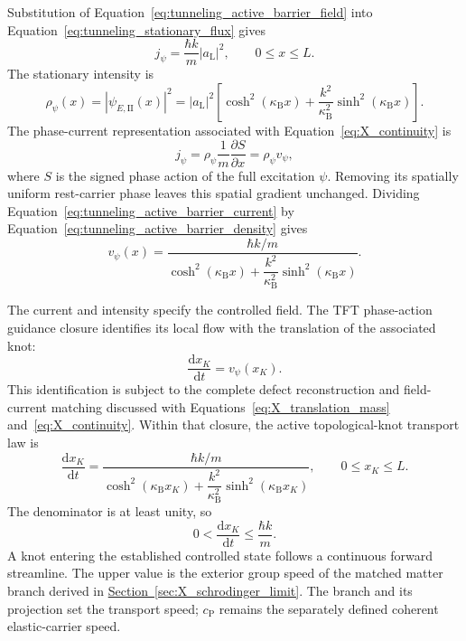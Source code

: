 Substitution of Equation~\eqref{eq:tunneling_active_barrier_field} into Equation~\eqref{eq:tunneling_stationary_flux} gives
\begin{equation}
    \boxed{
    j_\psi=\frac{\hbar k}{m}|a_{\mathrm L}|^2
    },\qquad 0\leq x\leq L.
    \label{eq:tunneling_active_barrier_current}
\end{equation}
The stationary intensity is
\begin{equation}
    \rho_\psi(x)
    =|\psi_{E,\mathrm{II}}(x)|^2
    =|a_{\mathrm L}|^2
    \left[
        \cosh^2(\kappa_{\mathrm B}x)
        +\frac{k^2}{\kappa_{\mathrm B}^2}
        \sinh^2(\kappa_{\mathrm B}x)
    \right].
    \label{eq:tunneling_active_barrier_density}
\end{equation}
The phase-current representation associated with Equation~\eqref{eq:X_continuity} is
\begin{equation}
    j_\psi
    =\rho_\psi\frac{1}{m}\frac{\partial S}{\partial x}
    =\rho_\psi v_\psi,
    \label{eq:tunneling_active_madelung_current}
\end{equation}
where $S$ is the signed phase action of the full excitation $\psi$. Removing its spatially uniform rest-carrier phase leaves this spatial gradient unchanged. Dividing Equation~\eqref{eq:tunneling_active_barrier_current} by Equation~\eqref{eq:tunneling_active_barrier_density} gives
\begin{equation}
    \boxed{
    v_\psi(x)
    =\frac{\hbar k/m}
    {\cosh^2(\kappa_{\mathrm B}x)
    +\dfrac{k^2}{\kappa_{\mathrm B}^2}\sinh^2(\kappa_{\mathrm B}x)}
    }.
    \label{eq:tunneling_active_phase_velocity}
\end{equation}

The current and intensity specify the controlled field. The TFT phase-action guidance closure identifies its local flow with the translation of the associated knot:
\begin{equation}
    \frac{\mathrm dx_K}{\mathrm dt}=v_\psi(x_K).
    \label{eq:tunneling_knot_guidance}
\end{equation}
This identification is subject to the complete defect reconstruction and field-current matching discussed with Equations~\eqref{eq:X_translation_mass} and~\eqref{eq:X_continuity}. Within that closure, the active topological-knot transport law is
\begin{equation}
    \boxed{
    \frac{\mathrm dx_K}{\mathrm dt}
    =\frac{\hbar k/m}
    {\cosh^2(\kappa_{\mathrm B}x_K)
    +\dfrac{k^2}{\kappa_{\mathrm B}^2}\sinh^2(\kappa_{\mathrm B}x_K)}
    },\qquad 0\leq x_K\leq L.
    \label{eq:tunneling_active_knot_transport}
\end{equation}
The denominator is at least unity, so
\begin{equation}
    0<\frac{\mathrm dx_K}{\mathrm dt}\leq\frac{\hbar k}{m}.
\end{equation}
A knot entering the established controlled state follows a continuous forward streamline. The upper value is the exterior group speed of the matched matter branch derived in \hyperref[sec:X_schrodinger_limit]{Section~\ref*{sec:X_schrodinger_limit}}. The branch and its projection set the transport speed; $c_{\mathrm P}$ remains the separately defined coherent elastic-carrier speed.

